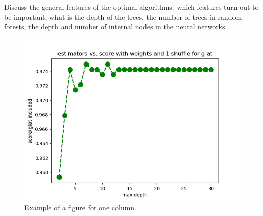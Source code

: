 Discuss the general features of the optimal algorithms: which features turn out to be important, what is the depth of the trees, the number of trees in random forests, the depth and number of internal nodes in the neural networks. 

\begin{figure}[h]
\includegraphics[width=\onepic\textwidth]{plots/Rf_maxdepth_oobscore_glat}
\caption{
Example of a figure for one column.
}
\label{fig:Maps_data}
\end{figure}


